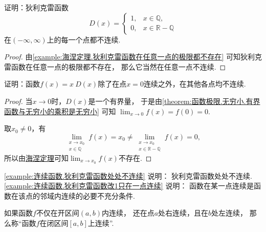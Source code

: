 \begin{example}\label{example:连续函数.狄利克雷函数处处不连续}
证明：狄利克雷函数\begin{equation*}
	D(x) = \left\{ \begin{array}{ll}
		1, & x \in \mathbb{Q}, \\
		0, & x \in \mathbb{R}-\mathbb{Q}
	\end{array} \right.
\end{equation*}在\((-\infty,\infty)\)上的每一个点都不连续.
\begin{proof}
由\cref{example:海涅定理.狄利克雷函数在任意一点的极限都不存在}
可知狄利克雷函数在任意一点的极限都不存在，
那么它当然在任意一点不连续.
\end{proof}
\end{example}
\begin{example}\label{example:连续函数.狄利克雷函数改1只在一点连续}
证明：函数\(f(x) = x~D(x)\)除了在点\(x=0\)连续之外，在其他各点均不连续.
\begin{proof}
当\(x\to0\)时，\(D(x)\)是一个有界量，
于是由\cref{theorem:函数极限.无穷小.有界函数与无穷小的乘积是无穷小} 可知
\(\lim_{x\to0} f(x) = f(0) = 0\).

取\(x_0\neq0\)，有\begin{equation*}
	\lim_{\substack{x \to x_0 \\ x \in \mathbb{Q}}} f(x)
	= x_0
	\neq
	\lim_{\substack{x \to x_0 \\ x \in \mathbb{R}-\mathbb{Q}}} f(x)
	= 0,
\end{equation*}
所以由\hyperref[theorem:极限.海涅定理]{海涅定理}可知\(\lim_{x \to x_0} f(x)\)不存在.
\end{proof}
\end{example}
\begin{remark}
\cref{example:连续函数.狄利克雷函数处处不连续} 说明：
狄利克雷函数处处不连续.
\cref{example:连续函数.狄利克雷函数改1只在一点连续} 说明：
函数在某一点连续是函数在该点的邻域内连续的必要不充分条件.
\end{remark}

\begin{definition}
如果函数\(f\)不仅在开区间\((a,b)\)内连续，
还在点\(a\)处右连续，且在\(b\)处左连续，
那么称“函数\(f\)在闭区间\([a,b]\)上连续”.
\end{definition}

